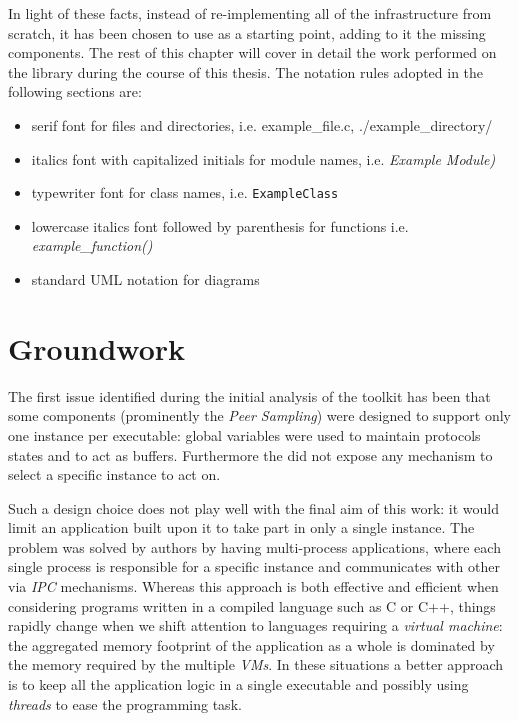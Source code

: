 In light of these facts, instead of re-implementing all of the
infrastructure from scratch, it has been chosen to use \grapes as a
starting point, adding to it the missing components.
The rest of this chapter will cover in detail the work performed on
the library during the course of this thesis. The notation rules
adopted in the following sections are:
\begin{itemize}
  \item serif font for files and directories, i.e. \textsf{example\_file.c},
    \textsf{./example\_directory/}
  \item italics font with capitalized initials for module names,
    i.e. \textit{Example Module)}
 \item typewriter font for class names, i.e. \texttt{ExampleClass}
  \item lowercase italics font followed by parenthesis for functions
    i.e. \textit{example\_function()}
  \item standard UML notation for diagrams
\end{itemize}

\section{Groundwork}
The first issue identified during the initial analysis of
the toolkit has been that some components (prominently the \textit{Peer
  Sampling}) were designed to support only one instance per
executable: global variables were used to maintain protocols states and
to act as buffers. Furthermore the \api did not expose any mechanism
to select a specific instance to act on.

Such a design choice does not play well with the final aim of this work: it
would limit an application built upon it to take part in only a single
\peersampling instance. The problem was solved by \grapes authors by
having multi-process applications, where each single process is
responsible for a specific instance and communicates with other
via \emph{IPC} mechanisms. Whereas this approach is both effective and
efficient when considering programs written in a compiled language
such as C or C++, things rapidly change when we shift attention to
languages requiring a \emph{virtual machine}: the aggregated memory
footprint of the application as a whole is dominated by the memory
required by the multiple \emph{VMs}. In these situations a better
approach is to keep all the application logic in a single executable
and possibly using \emph{threads} to ease the programming task.

